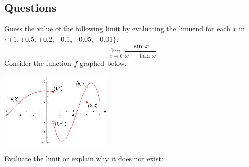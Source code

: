 \subsection*{Questions}
\begin{questions}
  \questioA Guess the value of the following limit by evaluating the limuend for each $ x $ in $ \{ \pm 1, \pm 0.5, \pm 0.2, \pm 0.1, \pm 0.05, \pm 0.01 \} $:
            \begin{displaymath}
              \lim_{x \to 0} \frac{\sin x}{x + \tan x}
            \end{displaymath}
  \questioA Consider the function $ f $ graphed below.
    \begin{center}
      \includegraphics[width=0.4\textwidth]{oslimit}
    \end{center}
  \questioM Evaluate the limit or explain why it does not exist:
    \begin{multicols}{2}
    \begin{parts}

\end{parts}
\end{multicols}
\end{questions}
